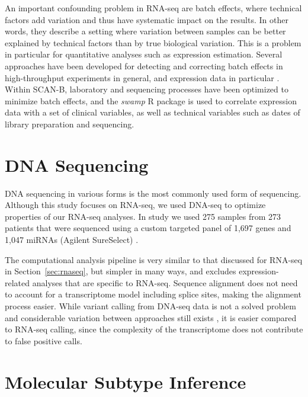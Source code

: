 \documentclass[11pt]{book}
\newcommand{\scanb}{\mbox{SCAN-B}}
\begin{document}
An important confounding problem in RNA-seq are batch effects, where technical factors add variation and thus have systematic impact on the results. In other words, they describe a setting where variation between samples can be better explained by technical factors than by true biological variation. This is a problem in particular for quantitative analyses such as expression estimation. Several approaches have been developed for detecting and correcting batch effects in high-throughput experiments in general, and expression data in particular \cite{Johnson:2007, Leek:2012, Lauss:2013, Leek:2014, Zhang:2020}. Within \scanb{}, laboratory and sequencing processes have been optimized to minimize batch effects, and the \textit{swamp} R package \cite{Lauss:2013} is used to correlate expression data with a set of clinical variables, as well as technical variables such as dates of library preparation and sequencing. 


\section{DNA Sequencing}

DNA sequencing in various forms is the most commonly used form of sequencing. Although this study focuses on RNA-seq, we used DNA-seq to optimize properties of our RNA-seq analyses. In study \IV we used 275 samples from 273 patients that were sequenced using a custom targeted panel of 1,697 genes and 1,047 miRNAs (Agilent SureSelect) \cite{Winter:2016a}.

The computational analysis pipeline is very similar to that discussed for RNA-seq in Section~\ref{sec:rnaseq}, but simpler in many ways, and excludes expression-related analyses that are specific to RNA-seq. Sequence alignment does not need to account for a transcriptome model including splice sites, making the alignment process easier. While variant calling from DNA-seq data is not a solved problem and considerable variation between approaches still exists \cite{Hofmann:2017, Ellrott:2018, Shi:2018}, it is easier compared to RNA-seq calling, since the complexity of the transcriptome does not contribute to false positive calls.


\section{Molecular Subtype Inference}
\label{sec:subtyping}
\end{document}
